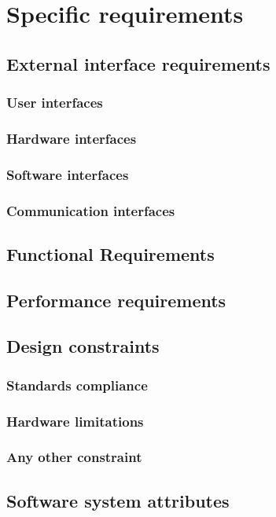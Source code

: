 \documentclass[12pt, a4paper]{report}
\begin{document}
\newpage 

\chapter{Specific requirements}
    \section{External interface requirements}
        \subsection{User interfaces}
        \subsection{Hardware interfaces}
        \subsection{Software interfaces}
        \subsection{Communication interfaces}
    \section{Functional Requirements}
    \section{Performance requirements}
    \section{Design constraints}
        \subsection{Standards compliance}
        \subsection{Hardware limitations}
        \subsection{Any other constraint}
    \section{Software system attributes}
\end{document}
